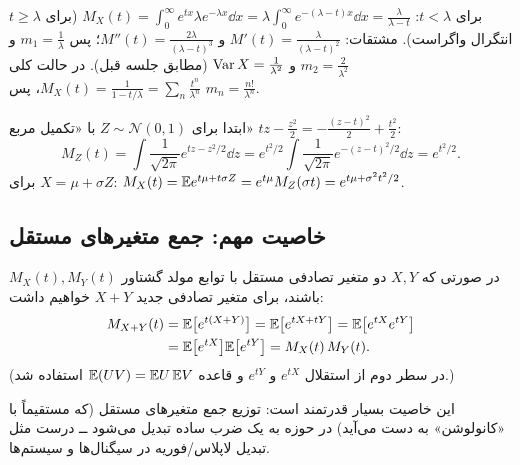 \begin{example}
\begin{solution}
برای $t<\lambda$:
$M_X(t)=\int_0^\infty e^{tx}\lambda e^{-\lambda x}\dd x=\lambda\int_0^\infty e^{-(\lambda-t)x}\dd x=\frac{\lambda}{\lambda-t}$ (برای $t\ge\lambda$ انتگرال واگراست).
مشتقات: $M'(t)=\frac{\lambda}{(\lambda-t)^2}$ و $M''(t)=\frac{2\lambda}{(\lambda-t)^3}$؛ پس $m_1=\frac1\lambda$ و $m_2=\frac{2}{\lambda^2}$ و $\operatorname{Var} X=\frac{1}{\lambda^2}$ (مطابق جلسه قبل). در حالت کلی $M_X(t)=\frac{1}{1-t/\lambda}=\sum_n\frac{t^n}{\lambda^n}$، پس $m_n=\frac{n!}{\lambda^n}$.
\end{solution}
\end{example}

\begin{example}
\begin{solution}
ابتدا برای $Z\sim\mathcal N(0,1)$ با «تکمیل مربع» $tz-\frac{z^2}{2}=-\frac{(z-t)^2}{2}+\frac{t^2}{2}$:
\[
M_Z(t)=\int\frac{1}{\sqrt{2\pi}}e^{tz-z^2/2}\dd z=e^{t^2/2}\int\frac{1}{\sqrt{2\pi}}e^{-(z-t)^2/2}\dd z=e^{t^2/2}.
\]
برای $X=\mu+\sigma Z$: $M_X(t)=\mathbb{E} e^{t\mu+t\sigma Z}=e^{t\mu}M_Z(\sigma t)=e^{t\mu+\sigma^2t^2/2}$.
\end{solution}
\end{example}

\subsection{خاصیت مهم:  جمع متغیرهای مستقل}
\begin{theorem}
در صورتی که $X,Y$ دو متغیر تصادفی مستقل با توابع مولد گشتاور $M_X(t),M_Y(t)$ باشند، برای متغیر تصادفی جدید $X+Y$ خواهیم داشت:
\[
\begin{aligned}
M_{X+Y}(t)&=\mathbb{E}\big[e^{t(X+Y)}\big]=\mathbb{E}\big[e^{tX+tY}\big]=\mathbb{E}\big[e^{tX}e^{tY}\big]\\
&=\mathbb{E}\big[e^{tX}\big]\mathbb{E}\big[e^{tY}\big]=M_X(t)\,M_Y(t).
\end{aligned}
\]
(در سطر دوم از استقلال $e^{tX}$ و $e^{tY}$ و قاعده $\mathbb{E}(UV)=\mathbb{E} U\,\mathbb{E} V$ استفاده شد.)
\end{theorem}
این خاصیت بسیار قدرتمند است: توزیع جمع متغیرهای مستقل (که مستقیماً با «کانولوشن» به دست می‌آید) در حوزه  به یک ضرب ساده تبدیل می‌شود ــ درست مثل تبدیل لاپلاس/فوریه در سیگنال‌ها و سیستم‌ها.

